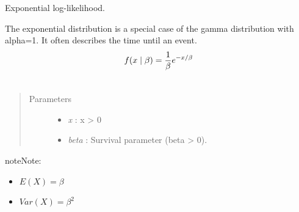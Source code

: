 \documentclass[letterpaper,10pt,english]{sphinxmanual}
\begin{document}
\begin{fulllineitems}
\label{distributions:pymc.distributions.exponential_like}
Exponential log-likelihood.

The exponential distribution is a special case of the gamma distribution
with alpha=1. It often describes the time until an event.
\begin{gather}
\begin{split}f(x \mid \beta) = \frac{1}{\beta}e^{-x/\beta}\end{split}\notag\\\begin{split}\end{split}\notag
\end{gather}\begin{quote}\begin{description}
\item[{Parameters }] \leavevmode\begin{itemize}
\item {} 
\emph{x} : x \textgreater{} 0

\item {} 
\emph{beta} : Survival parameter (beta \textgreater{} 0).

\end{itemize}

\end{description}\end{quote}

\begin{notice}{note}{Note:}\begin{itemize}
\item {} 
$E(X) = \beta$

\item {} 
$Var(X) = \beta^2$

\end{itemize}
\end{notice}

\end{fulllineitems}

\end{document}
